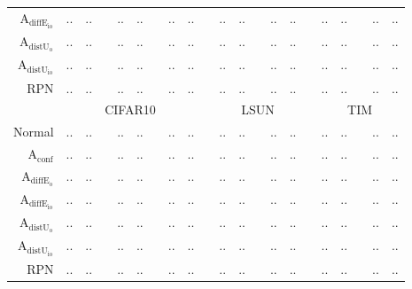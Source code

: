 \begin{table}[ht]
\begin{tiny}
\begin{tabular}{@{}rrrcrrcrrcrrcrrcrrcrr@{}}
			$\mathrm{A}_{\mathrm{diffE_{io}}}$ & .. & .. & & .. & .. & & .. & .. & & .. & .. & & .. & .. & & .. & .. & & .. & .. \\
			$\mathrm{A}_{\mathrm{distU_{o}}}$  & .. & .. & & .. & .. & & .. & .. & & .. & .. & & .. & .. & & .. & .. & & .. & .. \\
			$\mathrm{A}_{\mathrm{distU_{io}}}$ & .. & .. & & .. & .. & & .. & .. & & .. & .. & & .. & .. & & .. & .. & & .. & .. \\
			RPN                                & .. & .. & & .. & .. & & .. & .. & & .. & .. & & .. & .. & & .. & .. & & .. & .. \\
						\midrule
			& \multicolumn{8}{c}{CIFAR10} & & \multicolumn{5}{c}{LSUN} & & \multicolumn{5}{c}{TIM} \\
			Normal                             & .. & .. & & .. & .. & & .. & .. & & .. & .. & & .. & .. & & .. & .. & & .. & .. \\
			$\mathrm{A}_{\mathrm{conf}}$       & .. & .. & & .. & .. & & .. & .. & & .. & .. & & .. & .. & & .. & .. & & .. & .. \\
			$\mathrm{A}_{\mathrm{diffE_{o}}}$  & .. & .. & & .. & .. & & .. & .. & & .. & .. & & .. & .. & & .. & .. & & .. & .. \\
			$\mathrm{A}_{\mathrm{diffE_{io}}}$ & .. & .. & & .. & .. & & .. & .. & & .. & .. & & .. & .. & & .. & .. & & .. & .. \\
			$\mathrm{A}_{\mathrm{distU_{o}}}$  & .. & .. & & .. & .. & & .. & .. & & .. & .. & & .. & .. & & .. & .. & & .. & .. \\
			$\mathrm{A}_{\mathrm{distU_{io}}}$ & .. & .. & & .. & .. & & .. & .. & & .. & .. & & .. & .. & & .. & .. & & .. & .. \\
			RPN                                & .. & .. & & .. & .. & & .. & .. & & .. & .. & & .. & .. & & .. & .. & & .. & .. \\
			\bottomrule
		\end{tabular}
	\end{tiny}
	\label{tab:res_smoothing}
\end{table}








